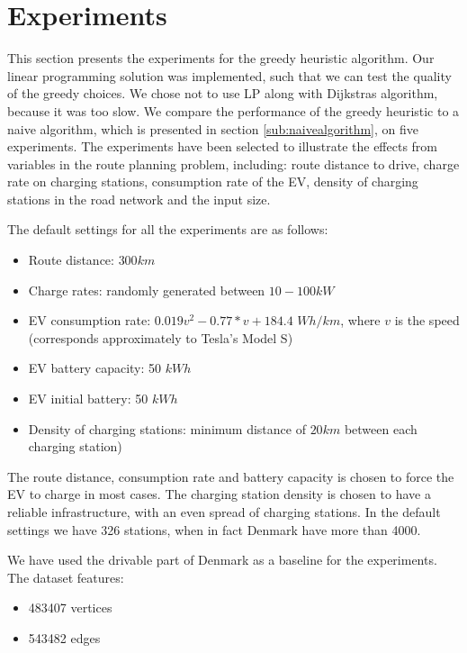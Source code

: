 \section{Experiments}
\label{sec:experiments}
This section presents the experiments for the greedy heuristic algorithm. Our linear programming solution was implemented, such that we can test the quality of the greedy choices. We chose not to use LP along with Dijkstras algorithm, because it was too slow. We compare the performance of the greedy heuristic to a naive algorithm, which is presented in section \ref{sub:naivealgorithm}, on five experiments. The experiments have been selected to illustrate the effects from variables in the route planning problem, including: route distance to drive, charge rate on charging stations, consumption rate of the EV, density of charging stations in the road network and the input size.

The default settings for all the experiments are as follows:
\begin{itemize}
     \item Route distance: $300 \si{km}$
     \item Charge rates: randomly generated between $10-100 \si{kW}$
     \item EV consumption rate: $0.019v^2-0.77*v+184.4$ $\si{Wh\per km}$, where $v$ is the speed (corresponds approximately to Tesla's Model S\cite{teslacon})
     \item EV battery capacity: 50 $\si{kWh}$
	 \item EV initial battery: 50 $\si{kWh}$
     \item Density of charging stations: minimum distance of $20 \si{km}$ between each charging station)
 \end{itemize} 

The route distance, consumption rate and battery capacity is chosen to force the EV to charge in most cases. The charging station density is chosen to have a reliable infrastructure, with an even spread of charging stations. In the default settings we have 326 stations, when in fact Denmark have more than 4000\cite{Globalevoutlook}. 

We have used the drivable part of Denmark as a baseline for the experiments. The dataset features:
\begin{itemize}
    \item 483407 vertices
    \item 543482 edges
\end{itemize}




















